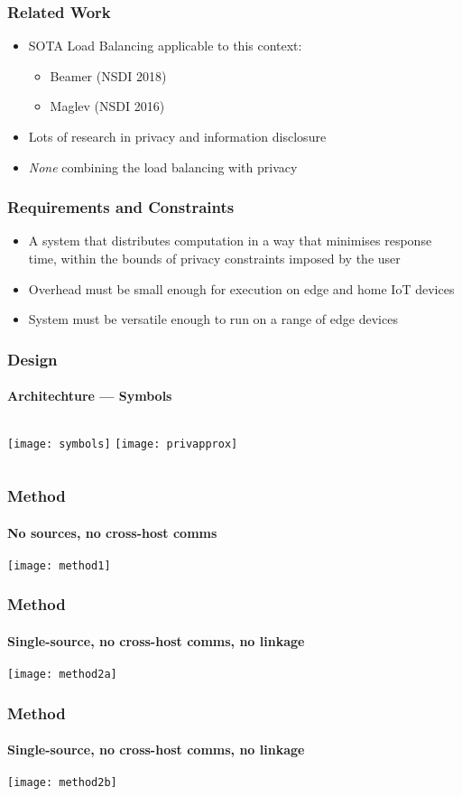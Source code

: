 \documentclass[aspectratio=169]{beamer}
\begin{document}
\begin{frame}
	\frametitle{Related Work}
	\begin{itemize}
		\item SOTA Load Balancing applicable to this context:
		\begin{itemize}
			\item Beamer (NSDI 2018)
			\item Maglev (NSDI 2016)
		\end{itemize}
		\item Lots of research in privacy and information disclosure
		\item \emph{None} combining the load balancing with privacy
	\end{itemize}
\end{frame}

\begin{frame}
	\frametitle{Requirements and Constraints}
	\begin{itemize}
		\item A system that distributes computation in a way that minimises response time, within the bounds of privacy constraints imposed by the user
		\item Overhead must be small enough for execution on edge and home IoT devices
		\item System must be versatile enough to run on a range of edge devices
	\end{itemize}
\end{frame}

\begin{frame}
	\frametitle{Design}
	\framesubtitle{Architechture --- Symbols}
	\begin{columns}[c]
		\texttt{[image: symbols]}
		\texttt{[image: privapprox]}
	\end{columns}
\end{frame}

\begin{frame}
	\frametitle{Method}
	\framesubtitle{No sources, no cross-host comms}
	\texttt{[image: method1]}
\end{frame}

\begin{frame}
	\frametitle{Method}
	\framesubtitle{Single-source, no cross-host comms, no linkage}
	\texttt{[image: method2a]}
\end{frame}

\begin{frame}
	\frametitle{Method}
	\framesubtitle{Single-source, no cross-host comms, no linkage}
	\texttt{[image: method2b]}
\end{frame}
\end{document}
